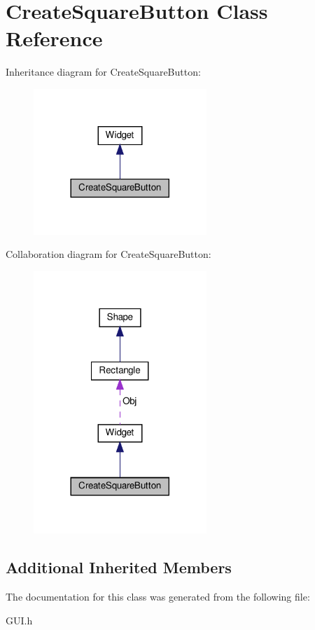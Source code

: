 \hypertarget{classCreateSquareButton}{}\section{Create\+Square\+Button Class Reference}
\label{classCreateSquareButton}


Inheritance diagram for Create\+Square\+Button\+:\nopagebreak
\begin{figure}[H]
\begin{center}
\leavevmode
\includegraphics[width=185pt]{classCreateSquareButton__inherit__graph}
\end{center}
\end{figure}


Collaboration diagram for Create\+Square\+Button\+:\nopagebreak
\begin{figure}[H]
\begin{center}
\leavevmode
\includegraphics[width=185pt]{classCreateSquareButton__coll__graph}
\end{center}
\end{figure}
\subsection*{Additional Inherited Members}


The documentation for this class was generated from the following file\+:\begin{DoxyCompactItemize}
\item 
G\+U\+I.\+h\end{DoxyCompactItemize}
